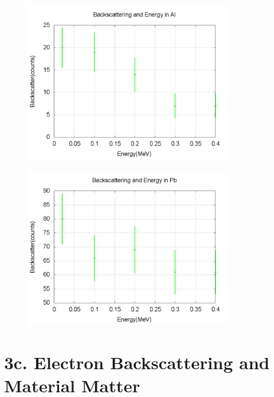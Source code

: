 \documentclass[aps,prl,twocolumn,superscriptaddress]{revtex4-1}
\begin{document}
\begin{figure}[h!]
  \begin{center}
\centerline{\includegraphics[width=3.5in]{enal.png}}
  \end{center}
\end{figure}
\begin{figure}[h!]
  \begin{center}
\centerline{\includegraphics[width=3.5in]{enpb.png}}
  \end{center}
\end{figure}

\section{3c. Electron Backscattering and Material Matter}
\end{document}
